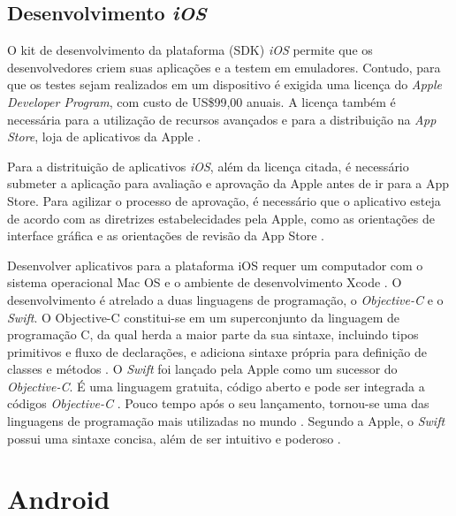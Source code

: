 \subsection{Desenvolvimento \textit{iOS}} \label{arc-ios-section}

O kit de desenvolvimento da plataforma (SDK) \textit{iOS} permite que os desenvolvedores criem suas aplicações e a testem em emuladores. 
Contudo, para que os testes sejam realizados em um dispositivo é exigida uma licença do \textit{Apple Developer Program}, 
com custo de US\$99,00 anuais. A licença também é necessária para a utilização de recursos avançados e para a distribuição 
na \textit{App Store}, loja de aplicativos da Apple \cite{apple_inc_program_2016}.   

Para a distrituição de aplicativos \textit{iOS}, além da licença citada, é necessário submeter a aplicação para avaliação e aprovação da Apple antes de ir para a App Store. Para agilizar o processo de aprovação, é necessário que o aplicativo esteja de acordo com as diretrizes estabelecidades pela Apple, como as orientações de interface gráfica e as orientações de revisão da App Store \cite{apple_inc_submitting_2016}.

Desenvolver aplicativos para a plataforma iOS requer um computador com o sistema operacional Mac OS e o ambiente de desenvolvimento Xcode \cite{heitkotter_evaluating_2013}. 
O desenvolvimento é atrelado a duas linguagens de programação, o \textit{Objective-C} e o \textit{Swift}.
O Objective-C constitui-se em um superconjunto da linguagem de programação C, da qual herda a maior parte da sua sintaxe, incluindo tipos primitivos e fluxo de declarações, e adiciona sintaxe própria para definição de classes e métodos \cite{apple_inc_about_2014}. 
O \textit{Swift} foi lançado pela Apple como um sucessor do \textit{Objective-C}. É uma linguagem gratuita, código aberto e pode ser integrada a códigos \textit{Objective-C} \cite{apple_inc_swift_2016}. Pouco tempo após o seu lançamento, tornou-se uma das linguagens de programação mais utilizadas no mundo \cite{rebouas_empirical_2016}. Segundo a Apple, o \textit{Swift} possui uma sintaxe concisa, além de ser intuitivo e poderoso \cite{apple_inc_swift_2016}.

\section{Android} \label{sec:android}

